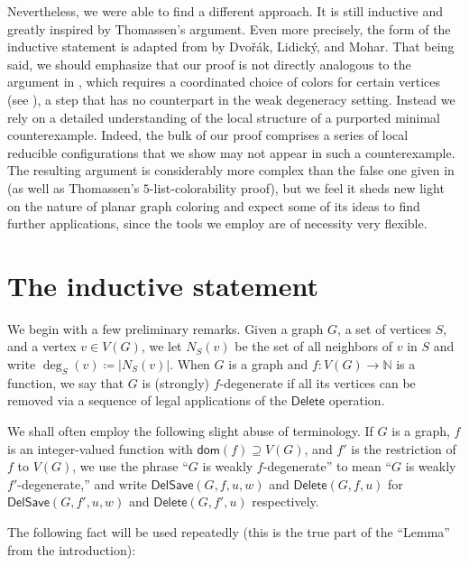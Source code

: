 \documentclass[11pt]{article}
\theoremstyle{slantthm}
\numberwithin{equation}{section}
\theoremstyle{definition}
\newcommand{\defeq}{\coloneqq}
\newcommand{\bemph}[1]{{\normalfont#1}}
\newcommand{\ep}[1]{\bemph{(}#1\bemph{)}}
\newcommand{\dom}{\mathsf{dom}}
\numberwithin{equation}{section}
\newcommand{\N}{\mathbb{N}}
\newcommand{\0}{\varnothing}
\newcommand{\emphd}[1]{{\fontseries{b}\selectfont\textsf{#1}}}
\newcommand{\del}{\mathsf{Delete}}
\newcommand{\delsave}{\mathsf{DelSave}}
\begin{document}
    Nevertheless, we were able to find a different approach. It is still inductive and greatly inspired by Thomassen's argument. Even more precisely, the form of the inductive statement is adapted from \cite[Theorem 6]{DLM} by Dvo\v{r}\'ak, Lidick\'y, and Mohar. That being said, we should emphasize that our proof is not directly analogous to the argument in \cite{DLM}, which requires a coordinated choice of colors for certain vertices (see \cite[p.~59, (X4b)]{DLM}), a step that has no counterpart in the weak degeneracy setting. Instead we rely on a detailed understanding of the local structure of a purported minimal counterexample. Indeed, the bulk of our proof comprises a series of local reducible configurations that we show may not appear in such a counterexample. The resulting argument is considerably more complex than the false one given in \cite{WD} (as well as Thomassen's $5$-list-colorability proof), but we feel it sheds new light on the nature of planar graph coloring and expect some of its ideas to find further applications, since the tools we employ are of necessity very flexible.
    
    \section{The inductive statement}

    

    We begin with a few preliminary remarks. Given a graph $G$, a set of vertices $S$, and a vertex $v \in V(G)$, we let $N_S(v)$ be the set of all neighbors of $v$ in $S$ and write $\deg_S(v) \defeq |N_S(v)|$. When $G$ is a graph and $f \colon V(G) \to \N$ is a function, we say that $G$ is \emphd{\ep{strongly} $f$-degenerate} if all its vertices can be removed via a sequence of legal applications of the $\del$ operation.
    
    We shall often employ the following slight abuse of terminology. If $G$ is a graph, $f$ is an integer-valued function with $\dom(f) \supseteq V(G)$, and $f'$ is the restriction of $f$ to $V(G)$, we use the phrase ``$G$ is weakly $f$-degenerate'' to mean ``$G$ is weakly $f'$-degenerate,'' and write $\delsave(G,f,u,w)$ and $\del(G,f,u)$ for $\delsave(G, f', u, w)$ and $\del(G,f',u)$ respectively. 

    The following fact will be used repeatedly (this is the true part of the ``Lemma'' from the introduction):
\end{document}
